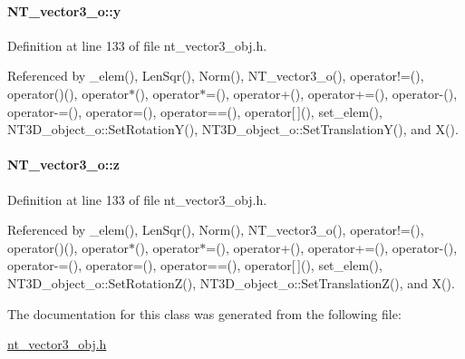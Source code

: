 \paragraph[{y}]{ {\bf NT\_\-vector3\_\-o::y}}\hfill\label{class_n_t__vector3__o_a8036171214f89de95702eaf19763efbd}


Definition at line 133 of file nt\_\-vector3\_\-obj.h.



Referenced by \_\-elem(), LenSqr(), Norm(), NT\_\-vector3\_\-o(), operator!=(), operator()(), operator$\ast$(), operator$\ast$=(), operator+(), operator+=(), operator-\/(), operator-\/=(), operator=(), operator==(), operator\mbox{[}$\,$\mbox{]}(), set\_\-elem(), NT3D\_\-object\_\-o::SetRotationY(), NT3D\_\-object\_\-o::SetTranslationY(), and X().

\paragraph[{z}]{ {\bf NT\_\-vector3\_\-o::z}}\hfill\label{class_n_t__vector3__o_a724c03f574c53d886dfac71710bf0a59}


Definition at line 133 of file nt\_\-vector3\_\-obj.h.



Referenced by \_\-elem(), LenSqr(), Norm(), NT\_\-vector3\_\-o(), operator!=(), operator()(), operator$\ast$(), operator$\ast$=(), operator+(), operator+=(), operator-\/(), operator-\/=(), operator=(), operator==(), operator\mbox{[}$\,$\mbox{]}(), set\_\-elem(), NT3D\_\-object\_\-o::SetRotationZ(), NT3D\_\-object\_\-o::SetTranslationZ(), and X().



The documentation for this class was generated from the following file:\begin{DoxyCompactItemize}
\item 
\hyperlink{nt__vector3__obj_8h}{nt\_\-vector3\_\-obj.h}\end{DoxyCompactItemize}
